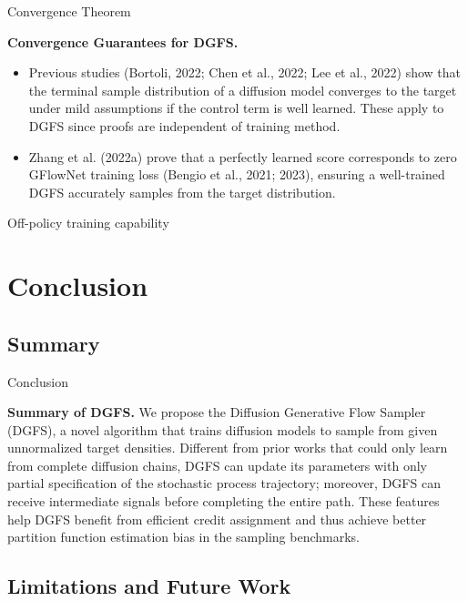 \documentclass[aspectratio=169,xcolor=dvipsnames]{beamer}
\begin{document}
\begin{frame}[t]{Convergence Theorem}
\footnotesize

\textbf{Convergence Guarantees for DGFS.}
\begin{itemize}\itemsep2pt
  \item Previous studies (Bortoli, 2022; Chen et al., 2022; Lee et al., 2022) show that the terminal sample distribution of a diffusion model converges to the target under mild assumptions if the control term is well learned. These apply to DGFS since proofs are independent of training method.
  \item Zhang et al. (2022a) prove that a perfectly learned score corresponds to zero GFlowNet training loss (Bengio et al., 2021; 2023), ensuring a well-trained DGFS accurately samples from the target distribution.
\end{itemize}

\end{frame}

\begin{frame}[t]{Off-policy training capability}
    \footnotesize

\end{frame}



\section{Conclusion}

\subsection{Summary}
\begin{frame}{Conclusion}
\footnotesize

\textbf{Summary of DGFS.} We propose the Diffusion Generative Flow Sampler (DGFS), a novel algorithm that trains diffusion models to sample from given unnormalized target densities. Different from prior works that could only learn from complete diffusion chains, DGFS can update its parameters with only partial specification of the stochastic process trajectory; moreover, DGFS can receive intermediate signals before completing the entire path. These features help DGFS benefit from efficient credit assignment and thus achieve better partition function estimation bias in the sampling benchmarks.

\end{frame}

\subsection{Limitations and Future Work}
\end{document}
